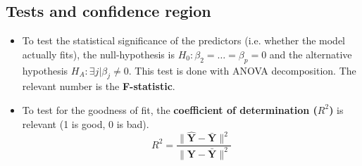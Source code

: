 \subsection{Tests and confidence region}
\begin{theory}
\begin{itemize}
 \item To test the statistical significance of the predictors (i.e. whether the model actually fits), the null-hypothesis is
$H_0: \beta_2 = \dotsc = \beta_p = 0$ and the alternative hypothesis $H_A: \exists j | \beta_j \neq 0$. This test is done with ANOVA decomposition.
The relevant number is the \textbf{F-statistic}.
 \item To test for the goodness of fit, the \textbf{coefficient of determination ($R^2$)} is relevant (1 is good, 0 is bad).
 \begin{equation*}
  R^2 = \frac{\| \hat{\mathbf{Y}} - \bar{\mathbf{Y}} \|^2 }{\| \mathbf{Y} - \bar{\mathbf{Y}} \|^2}
 \end{equation*}
\end{itemize}
\end{theory}

